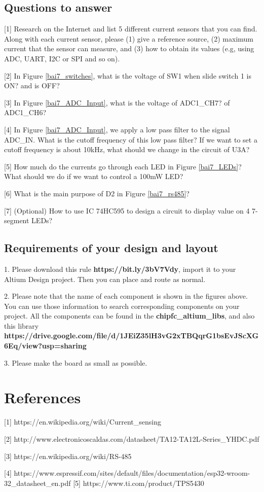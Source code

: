 \subsection{Questions to answer}
[1] Research on the Internet and list 5 different current sensors that you can find. Along with each current sensor, please (1) give a reference source, (2) maximum current that the sensor can measure, and (3) how to obtain its values (e.g, using ADC, UART, I2C or SPI and so on). 

[2] In Figure \ref{bai7_switches}, what is the voltage of SW1 when slide switch 1 is ON? and is OFF? 

[3] In Figure \ref{bai7_ADC_Input}, what is the voltage of ADC1\_CH7? of ADC1\_CH6? 
    
[4] In Figure \ref{bai7_ADC_Input}, we apply a low pass filter to the signal ADC\_IN. What is the cutoff frequency of this low pass filter? If we want to set a cutoff frequency is about 10kHz, what should we change in the circuit of U3A? 

[5] How much do the currents go through each LED in Figure \ref{bai7_LEDs}? What should we do if we want to control a 100mW LED? 

[6] What is the main purpose of D2 in Figure \ref{bai7_rs485}?

[7] (Optional) How to use IC 74HC595 to design a circuit to display value on 4 7-segment LEDs?

\subsection{Requirements of your design and layout}
1. Please download this rule 
\textbf{https://bit.ly/3bV7Vdy}, import it to your Altium Design project. Then you can place and route as normal. 

2. Please note that the name of each component is shown in the figures above. You can use those information to search corresponding components on your project. All the components can be found in the \textbf{chipfc\_altium\_libs}, and also this library \\
\textbf{https://drive.google.com/file/d/1JEiZ35lH3vG2xTBQqrG1bsEvJScXG6Eq/view?usp=sharing}

3. Please make the board as small as possible. 


\newpage
\section{References}
[1] https://en.wikipedia.org/wiki/Current\_sensing

[2] http://www.electronicoscaldas.com/datasheet/TA12-TA12L-Series\_YHDC.pdf

[3] https://en.wikipedia.org/wiki/RS-485

[4] https://www.espressif.com/sites/default/files/documentation/esp32-wroom-32\_datasheet\_en.pdf
[5] https://www.ti.com/product/TPS5430